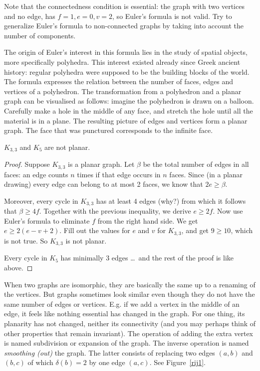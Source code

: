 Note that the connectedness condition is essential: the graph with two
vertices and no edge, has $f = 1, e = 0, v = 2$, so Euler's formula is
not valid. Try to generalize Euler's formula to
non-connected graphs by taking into account the number of components.

The origin of Euler's interest in this formula lies in the study of
spatial objects, more specifically polyhedra. This interest
existed already since Greek ancient history: regular polyhedra were
supposed to be the building blocks of the world. The formula expresses
the relation between the number of faces, edges and vertices of a
polyhedron. The transformation from a polyhedron and a planar graph
can be visualised as follows: imagine the polyhedron is drawn on a
balloon. Carefully make a hole in the middle of any face, and stretch
the hole until all the material is in a plane. The resulting picture
of edges and vertices form a planar graph. The face that was punctured
corresponds to the infinite face.

\begin{theorem}
$K_{3,3}$ and $K_{5}$ are not planar.
\end{theorem}
\begin{proof}
Suppose $K_{3,3}$ is a planar graph. Let $\beta$ be the total number
of edges in all faces: an edge counts $n$ times if that edge occurs in
$n$ faces. Since (in a planar drawing) every edge can belong to at most 2
faces, we know that $2e \geq \beta$.

Moreover, every cycle in $K_{3,3}$ has at least 4 edges (why?) from
which it follows that $\beta \geq 4f$. Together with the previous
inequality, we derive $e \geq 2f$. Now use Euler's formula to
eliminate $f$ from the right hand side. We get $e \geq 2(e-v+2)$.
Fill out the values for $e$ and $v$ for $K_{3,3}$, and get $9 \geq
10$, which is not true. So $K_{3,3}$ is not planar.

Every cycle in $K_{5}$ has minimally 3 edges \ldots\ and the rest of
the proof is like above.
\end{proof}


When two graphs are isomorphic, they are basically the same up to a
renaming of the vertices. But graphs sometimes look similar even
though they do not have the same number of edges or
vertices. E.g. if we add a vertex in the middle of an edge, it feels
like nothing essential has changed in the graph. For one thing, its
planarity has not changed, neither its connectivity (and you may
perhaps think of other properties that remain invariant). The
operation of adding the extra vertex is named subdivision or expansion
of the graph. The inverse operation is named {\em smoothing (out)} the
graph. The latter consists of replacing two edges $(a,b)$ and $(b,c)$
of which $\delta(b) = 2$ by one edge $(a,c)$. See Figure~\ref{rij1}.


